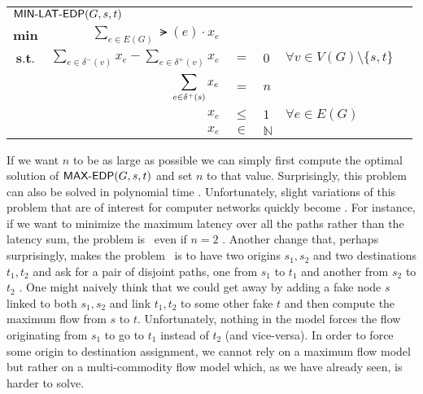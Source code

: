 \begin{center}
\begin{tabular}{crcllr}
\multicolumn{5}{l}{$\textsf{MIN-LAT-EDP}(G, s, t)$} \\[0.5cm] 
$\displaystyle \mathbf{min}$ & $\displaystyle \sum_{e \in E(G)} \lat(e) \cdot x_e$ & & & & \\[0.5cm]
$\textbf{s.t.}$ & $\displaystyle \sum_{e \in \delta^-(v)} x_{e} - \sum_{e \in \delta^+(v)} x_{e}$ & $=$    & $ 0$ & $\forall v \in V(G) \setminus \{ s, t \}$  &  \\[0.5cm]
                & $\displaystyle \sum_{e \in \delta^+(s)} x_e$ & $=$ & $n$ & \\[0.5cm]
                & $x_{e}$ & $\leq$ & $1$ & $\forall e \in E(G)$ & \\[0.5cm]
                & $x_{e}$ & $\in$ & $\mathbb{N}$
\end{tabular}
\end{center}

If we want $n$ to be as large as possible we can simply first compute the optimal solution of $\textsf{MAX-EDP}(G, s, t)$ and set $n$ to that value.
Surprisingly, this problem can also be solved in polynomial time \cite{Ahuja}. Unfortunately, slight variations of this problem that are of interest for computer
networks quickly become \NPhard. For instance, if we want to minimize the maximum latency over all the paths rather than the latency sum, the problem is 
\NPhard~even if $n = 2$ \cite{minmax-disjoint-90, Li1990}. Another change that, perhaps surprisingly, makes the problem \NPhard~is to have two origins $s_1, s_2$ and two destinations
$t_1, t_2$ and ask for a pair of disjoint paths, one from $s_1$ to $t_1$ and another from $s_2$ to $t_2$ \cite{VYGEN199583}. One might naively think that we could get away by adding a fake node 
$s$ linked to both $s_1, s_2$ and link $t_1, t_2$ to some other fake $t$ and then compute the maximum flow from $s$ to $t$. Unfortunately, nothing in the model
forces the flow originating from $s_1$ to go to $t_1$ instead of $t_2$ (and vice-versa). In order to force some origin to destination assignment, we cannot rely on a
maximum flow model but rather on a multi-commodity flow model which, as we have already seen, is harder to solve. 
